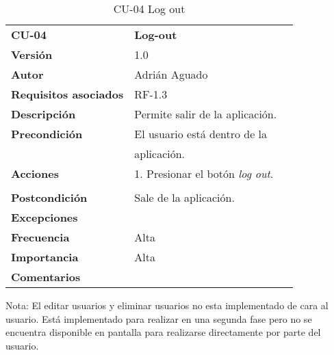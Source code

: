\begin{table}
\begin{tabular}{llr}  
\toprule
\begin{minipage}[b]{0.24\columnwidth}\raggedright\strut
\textbf{CU-04}\strut
\end{minipage} & \begin{minipage}[b]{0.72\columnwidth}\raggedright\strut
\textbf{Log-out}\strut
\end{minipage}\tabularnewline
\cmidrule(r){1-2}
\textbf{Versión}       & 1.0           \\
\textbf{Autor}       & Adrián  Aguado    \\
\textbf{Requisitos asociados}       & RF-1.3 \\ 
\textbf{Descripción} & Permite salir de la aplicación.\\
\textbf{Precondición} & El usuario está dentro de la \\
& aplicación.       \\
\textbf{Acciones} & 1. Presionar el botón \emph{log out}.\\
   \\
\textbf{Postcondición} & Sale de la aplicación.  \\
\textbf{Excepciones} &     \\
\textbf{Frecuencia} & Alta            \\
\textbf{Importancia} & Alta            \\
\textbf{Comentarios } &      \\
\bottomrule
\end{tabular}
\caption{CU-04 Log out} 
\end{table}

Nota: El editar usuarios y eliminar usuarios no esta implementado de cara al usuario. Está implementado para realizar en una segunda fase  pero no se encuentra disponible en pantalla para realizarse directamente por parte del usuario.

